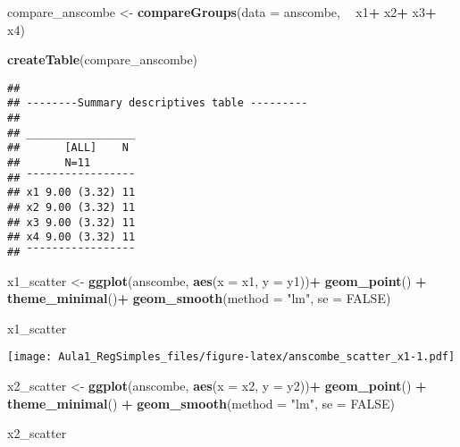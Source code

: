 \documentclass[]{article}
\newenvironment{Shaded}{\begin{snugshade}}{\end{snugshade}}
\newcommand{\DataTypeTok}[1]{\textcolor[rgb]{0.13,0.29,0.53}{#1}}
\newcommand{\KeywordTok}[1]{\textcolor[rgb]{0.13,0.29,0.53}{\textbf{#1}}}
\newcommand{\NormalTok}[1]{#1}
\newcommand{\OperatorTok}[1]{\textcolor[rgb]{0.81,0.36,0.00}{\textbf{#1}}}
\newcommand{\OtherTok}[1]{\textcolor[rgb]{0.56,0.35,0.01}{#1}}
\newcommand{\StringTok}[1]{\textcolor[rgb]{0.31,0.60,0.02}{#1}}
\begin{document}
\begin{Shaded}
\begin{Highlighting}[]
\NormalTok{compare_anscombe <-}\StringTok{ }\KeywordTok{compareGroups}\NormalTok{(}\DataTypeTok{data =}\NormalTok{ anscombe, }\OperatorTok{~}\StringTok{ }\NormalTok{x1}\OperatorTok{+}
\StringTok{                                     }\NormalTok{x2}\OperatorTok{+}
\StringTok{                                     }\NormalTok{x3}\OperatorTok{+}
\StringTok{                                     }\NormalTok{x4)}

\KeywordTok{createTable}\NormalTok{(compare_anscombe)}
\end{Highlighting}
\end{Shaded}

\begin{verbatim}
## 
## --------Summary descriptives table ---------
## 
## _________________ 
##       [ALL]    N  
##       N=11        
## ¯¯¯¯¯¯¯¯¯¯¯¯¯¯¯¯¯ 
## x1 9.00 (3.32) 11 
## x2 9.00 (3.32) 11 
## x3 9.00 (3.32) 11 
## x4 9.00 (3.32) 11 
## ¯¯¯¯¯¯¯¯¯¯¯¯¯¯¯¯¯
\end{verbatim}

\begin{Shaded}
\begin{Highlighting}[]
\NormalTok{x1_scatter <-}\StringTok{ }\KeywordTok{ggplot}\NormalTok{(anscombe, }\KeywordTok{aes}\NormalTok{(}\DataTypeTok{x =}\NormalTok{ x1, }\DataTypeTok{y =}\NormalTok{ y1))}\OperatorTok{+}
\StringTok{  }\KeywordTok{geom_point}\NormalTok{() }\OperatorTok{+}
\StringTok{  }\KeywordTok{theme_minimal}\NormalTok{()}\OperatorTok{+}
\StringTok{  }\KeywordTok{geom_smooth}\NormalTok{(}\DataTypeTok{method =} \StringTok{"lm"}\NormalTok{, }\DataTypeTok{se =} \OtherTok{FALSE}\NormalTok{)}

\NormalTok{x1_scatter}
\end{Highlighting}
\end{Shaded}

\texttt{[image: Aula1\_RegSimples\_files/figure-latex/anscombe\_scatter\_x1-1.pdf]}

\begin{Shaded}
\begin{Highlighting}[]
\NormalTok{x2_scatter <-}\StringTok{ }\KeywordTok{ggplot}\NormalTok{(anscombe, }\KeywordTok{aes}\NormalTok{(}\DataTypeTok{x =}\NormalTok{ x2, }\DataTypeTok{y =}\NormalTok{ y2))}\OperatorTok{+}
\StringTok{  }\KeywordTok{geom_point}\NormalTok{() }\OperatorTok{+}
\StringTok{  }\KeywordTok{theme_minimal}\NormalTok{() }\OperatorTok{+}
\StringTok{  }\KeywordTok{geom_smooth}\NormalTok{(}\DataTypeTok{method =} \StringTok{"lm"}\NormalTok{, }\DataTypeTok{se =} \OtherTok{FALSE}\NormalTok{)}

\NormalTok{x2_scatter}
\end{Highlighting}
\end{Shaded}
\end{document}
